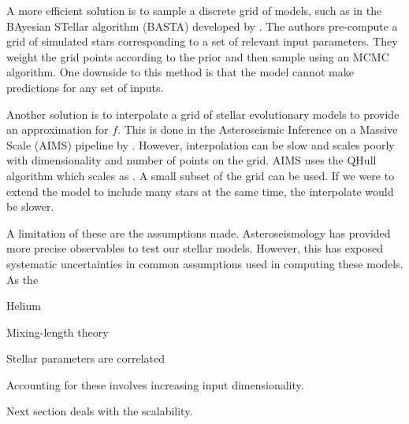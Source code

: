 A more efficient solution is to sample a discrete grid of models, such as in the BAyesian STellar algorithm (BASTA) developed by \citet{AguirreBorsen-Koch.Rorsted.ea2022}. The authors pre-compute a grid of simulated stars corresponding to a set of relevant input parameters. They weight the grid points according to the prior and then sample using an MCMC algorithm. One downside to this method is that the model cannot make predictions for any set of inputs.

Another solution is to interpolate a grid of stellar evolutionary models to provide an approximation for \(f\). This is done in the Asteroseismic Inference on a Massive Scale (AIMS) pipeline by \citet{Rendle.Buldgen.ea2019}. However, interpolation can be slow and scales poorly with dimensionality and number of points on the grid. AIMS uses the QHull algorithm which scales as . A small subset of the grid can be used. If we were to extend the model to include many stars at the same time, the interpolate would be slower.

A limitation of these are the assumptions made. Asteroseismology has provided more precise observables to test our stellar models. However, this has exposed systematic uncertainties in common assumptions used in computing these models. As the 

Helium

Mixing-length theory

Stellar parameters are correlated


Accounting for these involves increasing input dimensionality.

Next section deals with the scalability.



